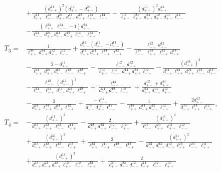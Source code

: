 \documentclass[a4,10pt]{amsart}
\numberwithin{equation}{section}
\theoremstyle{definition}
\begin{document}
\begin{align*}
&+\frac{(d^{11}_{++})^2(d^{14}_{+-}-d^{24}_{++})}
{\ell^{11}_{++}\ell^{24}_{+-}d^{24}_{++}d^{14}_{+-}
d^{12}_{-+}\ell^{14}_{++}\ell^{14}_{--}}
-\frac{(d^{11}_{++})^2d^{14}_{++}}
{\ell^{11}_{++}\ell^{24}_{+-}d^{24}_{++}d^{12}_{+-}
d^{14}_{+-}\ell^{14}_{--}}\\
&-\frac{(\ell^{24}_{++}\ell^{24}_{--}-1)d^{24}_{+-}}
{\ell^{24}_{--}d^{24}_{++}d^{14}_{+-}d^{12}_{-+}
\ell^{14}_{--}\ell^{14}_{++}},
\\[2mm]
T_3
=&\frac{1}
{\ell^{44}_{++}d^{14}_{-+}d^{12}_{+-}\ell^{12}_{--}}
+\frac{d^{12}_{+-}(d^{12}_{+-}+d^{14}_{+-})}
{d^{14}_{-+}d^{24}_{++}\ell^{14}_{++}\ell^{12}_{-+}}
-\frac{\ell^{12}_{--}d^{12}_{+-}}
{\ell^{14}_{--}\ell^{14}_{++}\ell^{12}_{-+}d^{14}_{-+}}\\
&-\frac{2-d^{11}_{++}}
{\ell^{44}_{++}d^{24}_{++}d^{12}_{+-}\ell^{12}_{--}\ell^{12}_{-+}}
-\frac{\ell^{12}_{--}d^{12}_{-+}}
{\ell^{14}_{++}\ell^{14}_{--}d^{14}_{-+}d^{24}_{++}\ell^{12}_{-+}}
-\frac{(d^{44}_{++})^2}
{d^{14}_{-+}\ell^{44}_{++}d^{24}_{++}\ell^{12}_{--}d^{12}_{+-}}\\
&-\frac{\ell^{12}_{--}(d^{12}_{+-})^2}
{\ell^{14}_{--}\ell^{14}_{++}d^{14}_{-+}d^{24}_{++}\ell^{12}_{-+}}
+\frac{\ell^{44}_{--}}
{d^{24}_{++}d^{12}_{+-}\ell^{12}_{--}}
+\frac{d^{12}_{+-}+d^{44}_{++}}
{d^{24}_{++}d^{14}_{-+}d^{12}_{+-}}\\
&-\frac{2}
{d^{24}_{++}\ell^{44}_{++}d^{14}_{-+}\ell^{12}_{-+}}
+\frac{-\ell^{44}_{--}}
{d^{14}_{-+}d^{12}_{+-}\ell^{12}_{--}}
-\frac{1}
{\ell^{44}_{++}d^{14}_{-+}d^{12}_{+-}\ell^{12}_{-+}}
+\frac{2d^{12}_{+-}}
{d^{14}_{-+}\ell^{14}_{++}\ell^{12}_{-+}},
\\[2mm]
T_4
=&-\frac{(d^{11}_{++})^2}
{d^{13}_{-+}\ell^{23}_{++}\ell^{23}_{--}\ell^{11}_{++}}
-\frac{2}
{d^{12}_{-+}d^{23}_{-+}\ell^{12}_{--}\ell^{12}_{++}}
+\frac{(d^{11}_{++})^2}
{\ell^{23}_{--}\ell^{23}_{++}\ell^{11}_{++}\ell^{12}_{--}}\\
&+\frac{(d^{33}_{++})^2}
{d^{13}_{-+}\ell^{12}_{++}\ell^{12}_{--}\ell^{33}_{++}}
+\frac{2}
{\ell^{33}_{++}\ell^{11}_{++}\ell^{12}_{--}\ell^{12}_{++}}
-\frac{(d^{11}_{++})^2}
{d^{13}_{-+}d^{23}_{-+}d^{12}_{-+}
\ell^{23}_{++}\ell^{23}_{--}\ell^{11}_{++}}\\
&+\frac{(d^{33}_{++})^2}
{d^{13}_{-+}d^{23}_{-+}d^{12}_{-+}
\ell^{12}_{++}\ell^{12}_{--}\ell^{33}_{++}}
+\frac{2}
{\ell^{33}_{++}d^{23}_{-+}d^{12}_{-+}
\ell^{11}_{++}\ell^{12}_{--}\ell^{12}_{++}}\\

\end{align*}
\end{document}
